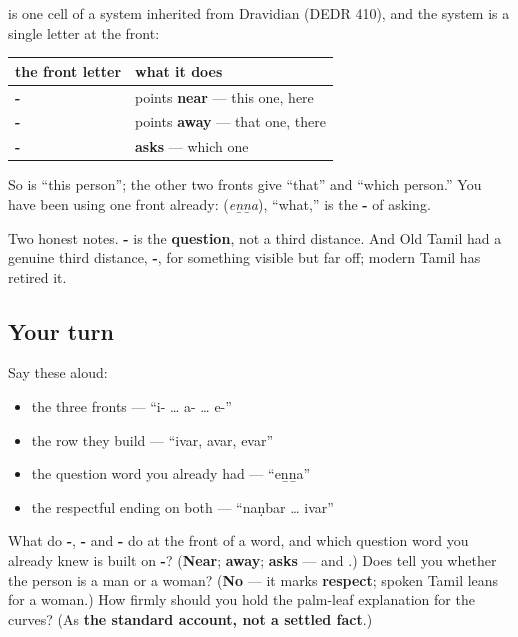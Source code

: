 \begin{grammarlens}[title={Grammar Lens: near, far, and which}]
\textbf{} is one cell of a system inherited from Dravidian (DEDR 410), and the system is a single letter at the front:

\noindent
\begin{tabularx}{\linewidth}{@{}>{\raggedright\arraybackslash}X>{\raggedright\arraybackslash}X@{}}
\toprule
\textbf{the front letter} & \textbf{what it does} \\
\midrule
\textbf{\ta{இ}-} & points \textbf{near} — this one, here \\
\textbf{\ta{அ}-} & points \textbf{away} — that one, there \\
\textbf{\ta{எ}-} & \textbf{asks} — which one \\
\bottomrule
\end{tabularx}

So \textbf{} is \textquotedblleft{}this person\textquotedblright{}; the other two fronts give \textquotedblleft{}that\textquotedblright{} and \textquotedblleft{}which person.\textquotedblright{} You have been using one front already: \textbf{} (\emph{eṉṉa}), \textquotedblleft{}what,\textquotedblright{} is the \textbf{-} of asking.

Two honest notes. \textbf{-} is the \textbf{question}, not a third distance. And Old Tamil had a genuine third distance, \textbf{-}, for something visible but far off; modern Tamil has retired it.
\end{grammarlens}

\subsection*{Your turn}
Say these aloud:

\begin{itemize}
\raggedright
  \item the three fronts — \textquotedblleft{}i- … a- … e-\textquotedblright{}
  \item the row they build — \textquotedblleft{}ivar, avar, evar\textquotedblright{}
  \item the question word you already had — \textquotedblleft{}eṉṉa\textquotedblright{}
  \item the respectful ending on both — \textquotedblleft{}naṇbar … ivar\textquotedblright{}
\end{itemize}

\begin{tcolorbox}[breakable,colback=teal!4,colframe=teal!35!black,title={Before you move on}]
What do \textbf{-}, \textbf{-} and \textbf{-} do at the front of a word, and which question word you already knew is built on \textbf{-}? (\textbf{Near}; \textbf{away}; \textbf{asks} — and \textbf{}.) Does \textbf{} tell you whether the person is a man or a woman? (\textbf{No} — it marks \textbf{respect}; spoken Tamil leans \textbf{} for a woman.) How firmly should you hold the palm-leaf explanation for the curves? (As \textbf{the standard account, not a settled fact}.)
\end{tcolorbox}
